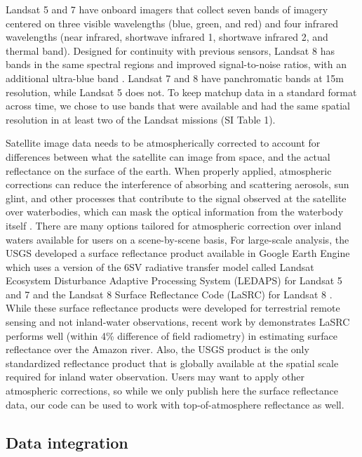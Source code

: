 \documentclass[]{agujournal2018}
\begin{document}
Landsat 5 and 7 have onboard imagers that collect seven bands of imagery
centered on three visible wavelengths (blue, green, and red) and four
infrared wavelengths (near infrared, shortwave infrared 1, shortwave
infrared 2, and thermal band). Designed for continuity with previous
sensors, Landsat 8 has bands in the same spectral regions and improved
signal-to-noise ratios, with an additional ultra-blue band
\citep{Barsi2014}. Landsat 7 and 8 have panchromatic bands at 15m
resolution, while Landsat 5 does not. To keep matchup data in a standard
format across time, we chose to use bands that were available and had
the same spatial resolution in at least two of the Landsat missions (SI
Table 1).

Satellite image data needs to be atmospherically corrected to account
for differences between what the satellite can image from space, and the
actual reflectance on the surface of the earth. When properly applied,
atmospheric corrections can reduce the interference of absorbing and
scattering aerosols, sun glint, and other processes that contribute to
the signal observed at the satellite over waterbodies, which can mask
the optical information from the waterbody itself \citep{Gordon1997}.
There are many options tailored for atmospheric correction over inland
waters available for users on a scene-by-scene basis, For large-scale
analysis, the USGS developed a surface reflectance product available in
Google Earth Engine which uses a version of the 6SV radiative transfer
model called Landsat Ecosystem Disturbance Adaptive Processing System
(LEDAPS) for Landsat 5 and 7 \citep{Ju2012} and the Landsat 8 Surface
Reflectance Code (LaSRC) for Landsat 8 \citep{Doxani2018,Vermote2016}.
While these surface reflectance products were developed for terrestrial
remote sensing and not inland-water observations, recent work by
\citet{Kuhn2019} demonstrates LaSRC performs well (within 4\% difference
of field radiometry) in estimating surface reflectance over the Amazon
river. Also, the USGS product is the only standardized reflectance
product that is globally available at the spatial scale required for
inland water observation. Users may want to apply other atmospheric
corrections, so while we only publish here the surface reflectance data,
our code can be used to work with top-of-atmosphere reflectance as well.

\subsection{Data integration}
\end{document}
